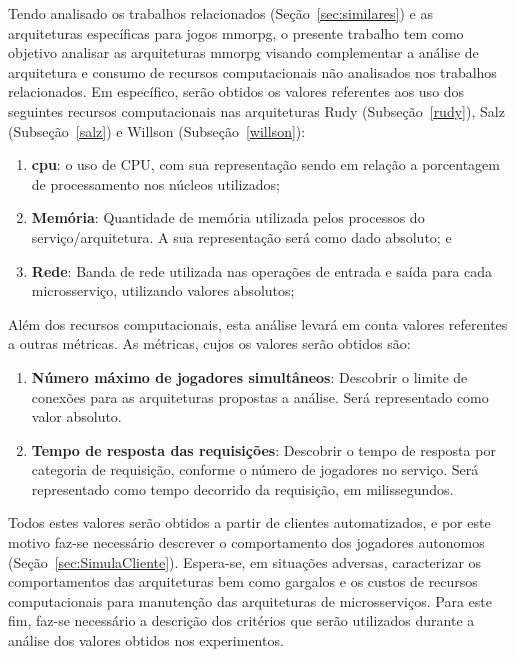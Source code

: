 Tendo analisado os trabalhos relacionados (Seção~\ref{sec:similares}) e as arquiteturas específicas para jogos \ac{mmorpg}, o presente trabalho tem como objetivo analisar as arquiteturas \ac{mmorpg} visando complementar a análise de arquitetura e consumo de recursos computacionais não analisados nos trabalhos relacionados.
%
Em específico, serão obtidos os valores referentes aos uso dos seguintes recursos computacionais nas arquiteturas Rudy (Subseção~\ref{rudy}), Salz (Subseção~\ref{salz}) e Willson (Subseção~\ref{willson}):

\begin{enumerate}
  \item \textbf{\ac{cpu}}: o uso de CPU, com sua representação sendo em relação a porcentagem de processamento nos núcleos utilizados;
  \item \textbf{Memória}: Quantidade de memória utilizada pelos processos do serviço/arquitetura. A sua representação será como dado absoluto; e
  \item \textbf{Rede}: Banda de rede utilizada nas operações de entrada e saída para cada microsserviço, utilizando valores absolutos;
\end{enumerate}

Além dos recursos computacionais, esta análise levará em conta valores referentes a outras métricas.
%
As métricas, cujos os valores serão obtidos são:

\begin{enumerate}
  \item \textbf{Número máximo de jogadores simultâneos}: Descobrir o limite de conexões para as arquiteturas propostas a análise. Será representado como valor absoluto.
  \item \textbf{Tempo de resposta das requisições}: Descobrir o tempo de resposta por categoria de requisição, conforme o número de jogadores no serviço. Será representado como tempo decorrido da requisição, em milissegundos.
\end{enumerate}

Todos estes valores serão obtidos a partir de clientes automatizados, e por este motivo faz-se necessário descrever o comportamento dos jogadores autonomos (Seção~\ref{sec:SimulaCliente}).
%
Espera-se, em situações adversas, caracterizar os comportamentos das arquiteturas bem como gargalos e os custos de recursos computacionais para manutenção das arquiteturas de microsserviços.
%
Para este fim, faz-se necessário a descrição dos critérios que serão utilizados durante a análise dos valores obtidos nos experimentos.

